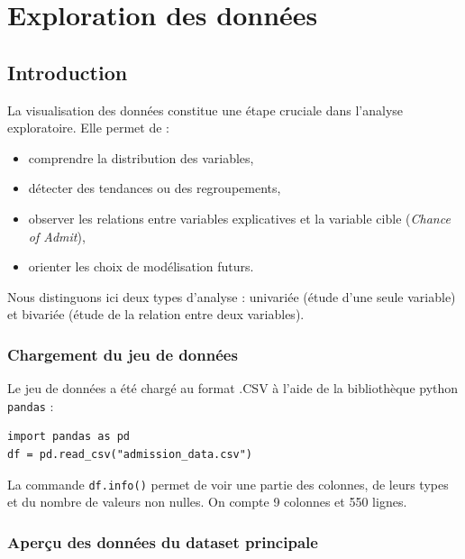 \chapter{Exploration des données}

\section{Introduction}

La visualisation des données constitue une étape cruciale dans l’analyse exploratoire. Elle permet de :
\begin{itemize}
	\item comprendre la distribution des variables,
	\item détecter des tendances ou des regroupements,
	\item observer les relations entre variables explicatives et la variable cible (\textit{Chance of Admit}),
	\item orienter les choix de modélisation futurs.
\end{itemize}

Nous distinguons ici deux types d’analyse : univariée (étude d’une seule variable) et bivariée (étude de la relation entre deux variables).

\subsection{Chargement du jeu de données}

Le jeu de données  a été chargé au format .CSV à l’aide de la bibliothèque python \texttt{pandas} :

\begin{verbatim}
import pandas as pd
df = pd.read_csv("admission_data.csv")
\end{verbatim}

La commande \texttt{df.info()} permet de voir une partie des colonnes, de leurs types et du nombre de valeurs non nulles. On compte 9 colonnes et 550 lignes.

\subsection{Aperçu des données du dataset principale}

